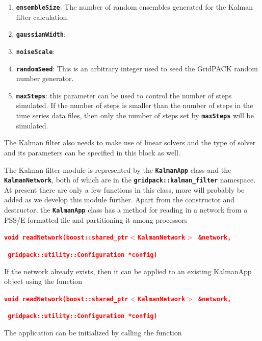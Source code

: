 \documentclass[12pt]{report} %
\begin{document}
\begin{enumerate}
\item  \texttt{\textbf{ensembleSize}}: The number of random ensembles generated for the Kalman filter calculation.

\item  \texttt{\textbf{gaussianWidth}}: 

\item  \texttt{\textbf{noiseScale}}:

\item  \texttt{\textbf{randomSeed}}: This is an arbitrary integer used to seed the GridPACK random number generator.

\item  \texttt{\textbf{maxSteps}}: this parameter can be used to control the number of steps simulated. If the number of steps is smaller than the number of steps in the time series data files, then only the number of steps set by \texttt{\textbf{maxSteps}} will be simulated.
\end{enumerate}

The Kalman filter also needs to make use of linear solvers and the type of solver and its parameters can be specified in this block as well.

The Kalman filter module is represented by the \texttt{\textbf{KalmanApp}} class and the \texttt{\textbf{KalmanNetwork}}, both of which are in the \texttt{\textbf{gridpack::kalman\_filter}} namespace. At present there are only a few functions in this class, more will probably be added as we develop this module further. Apart from the constructor and destructor, the \texttt{\textbf{KalmanApp}} class has a method for reading in a network from a PSS/E formatted file and partitioning it among processors

\textcolor{red}{\texttt{\textbf{void readNetwork(boost::shared\_ptr$\boldsymbol{\mathrm{<}}$KalmanNetwork$\boldsymbol{\mathrm{>}}$ \&network,}}}

\textcolor{red}{\texttt{\textbf{    gridpack::utility::Configuration *config)}}}

If the network already exists, then it can be applied to an existing KalmanApp object using the function

\textcolor{red}{\texttt{\textbf{void readNetwork(boost::shared\_ptr$\boldsymbol{\mathrm{<}}$KalmanNetwork$\boldsymbol{\mathrm{>}}$ \&network,}}}

\textcolor{red}{\texttt{\textbf{    gridpack::utility::Configuration *config)}}}

The application can be initialized by calling the function
\end{document}
